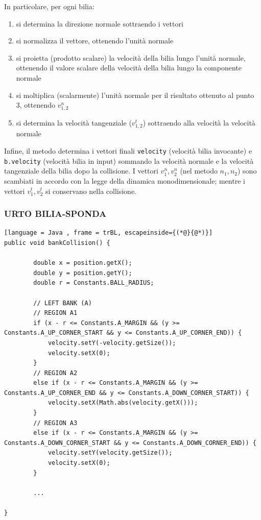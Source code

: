 \documentclass[12pt,a4paper]{report}
\begin{document}
In particolare, per ogni bilia:
\begin{enumerate}
	\item si determina la direzione normale sottraendo i vettori 
	\item si normalizza il vettore, ottenendo l'unità normale
	\item si proietta (prodotto scalare) la velocità della bilia lungo l'unità normale, ottenendo il valore scalare della velocità della bilia lungo la componente normale
	\item si moltiplica (scalarmente) l'unità normale per il risultato ottenuto al punto 3, ottenendo $v_{1,2}^n$
	\item si determina la velocità tangenziale ($v_{1,2}^t$) sottraendo alla velocità la velocità normale
\end{enumerate}

Infine, il metodo determina i vettori finali \texttt{velocity} (velocità bilia invocante) e \texttt{b.velocity} (velocità bilia in input) sommando la velocità normale e la velocità tangenziale della bilia dopo la collisione.
I vettori $v_1^n, v_2^n$ (nel metodo $n_1, n_2$) sono scambiati in accordo con la legge della dinamica monodimensionale; mentre i vettori $v_1^t, v_2^t$ si conservano nella collisione.

\pagebreak
\subsubsection*{URTO BILIA-SPONDA} 

\begin{lstlisting}[language = Java , frame = trBL, escapeinside={(*@}{@*)}]
public void bankCollision() {

        double x = position.getX();
        double y = position.getY();
        double r = Constants.BALL_RADIUS;

        // LEFT BANK (A)
        // REGION A1
        if (x - r <= Constants.A_MARGIN && (y >= Constants.A_UP_CORNER_START && y <= Constants.A_UP_CORNER_END)) {
            velocity.setY(-velocity.getSize());
            velocity.setX(0);
        }
        // REGION A2
        else if (x - r <= Constants.A_MARGIN && (y >= Constants.A_UP_CORNER_END && y <= Constants.A_DOWN_CORNER_START)) {
            velocity.setX(Math.abs(velocity.getX()));
        }
        // REGION A3
        else if (x - r <= Constants.A_MARGIN && (y >= Constants.A_DOWN_CORNER_START && y <= Constants.A_DOWN_CORNER_END)) {
            velocity.setY(velocity.getSize());
            velocity.setX(0);
        }
        
        ...
        
}
\end{lstlisting}
\end{document}
